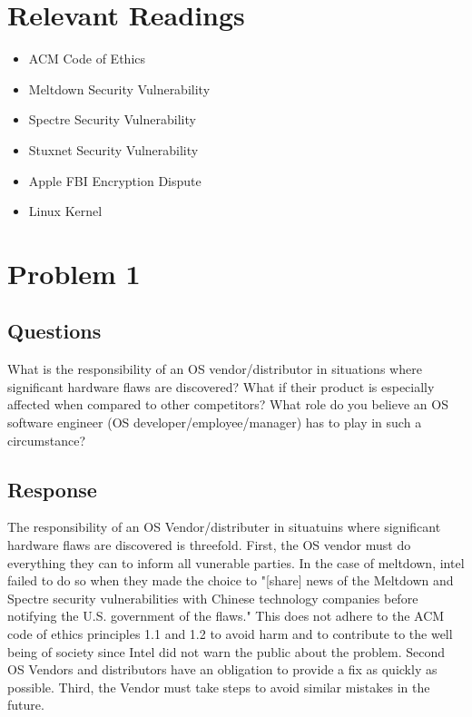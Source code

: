 \documentclass{assignment-x}
\begin{document}
\maketitle
\pagebreak

\section{Relevant Readings}
\begin{itemize}
    \item ACM Code of Ethics \cite{ACMCodeOfEthics}
    \item Meltdown Security Vulnerability \cite{meltdownWikipedia}
    \item Spectre Security Vulnerability \cite{spectre_wikipedia}
    \item Stuxnet Security Vulnerability \cite{stuxnet_wikipedia}
    \item Apple FBI Encryption Dispute \cite{apple_fbi_encryption_dispute_wikipedia}
    \item Linux Kernel \cite{linux_kernel_wikipedia}
\end{itemize}


\section{Problem 1}
\subsection{Questions}
What is the responsibility of an OS vendor/distributor in situations where significant hardware flaws are discovered?
What if their product is especially affected when compared to other competitors?
What role do you believe an OS software engineer (OS developer/employee/manager) has to play in such a circumstance?
\subsection{Response}
The responsibility of an OS Vendor/distributer in situatuins where significant hardware flaws are discovered is threefold. First, the OS vendor must do everything they can to inform all vunerable parties. In the case of meltdown, intel failed to do so when they made the choice to "[share] news of the Meltdown and Spectre security vulnerabilities with Chinese technology companies before notifying the U.S. government of the flaws."\cite{meltdownWikipedia} This does not adhere to the ACM code of ethics principles 1.1 and 1.2 to avoid harm and to contribute to the well being of society \cite{ACMCodeOfEthics} since Intel did not warn the public about the problem. Second OS Vendors and distributors have an obligation to provide a fix as quickly as possible. Third, the Vendor must take steps to avoid similar mistakes in the future.
\end{document}
